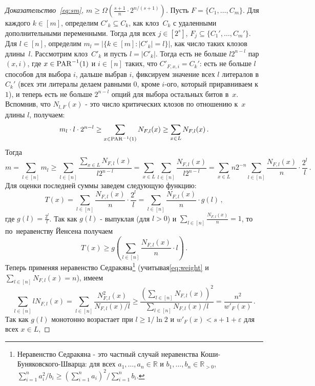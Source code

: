 \begin{proof}[Доказательство~\eqref{eq:sm}, $m \ge \Omega\left(\frac{s+1}{n} \cdot 2^{n/(s+1)}\right)$]
	Пусть $F=\{C_1, \dotsc, C_m\}$. Для каждого $k \in [m]$, определим $C'_k \subseteq C_k$,
	как клоз~$C_k$ с удаленными дополнительными переменными. Тогда для всех
	$j \in [2^s]$, $F_j \subseteq \{C_1', \dotsc, C_m'\}$. Для $l \in [n]$,
	определим $m_l=|\{k \in [m] \colon |C'_k|=l\}|$, как число таких клозов длины~$l$.
	Рассмотрим клоз~$C'_k$
	и пусть $l=|C'_k|$. Тогда есть не больше $l2^{n-l}$ пар $(x,i)$,
	где $x \in \operatorname{PAR}^{-1}(1)$ и $i \in [n]$ таких, что $C'_{F,x,i}=C_k'$:
	есть не больше $l$ способов для выбора $i$, дальше выбрав $i$, 
	фиксируем значение всех $l$ литералов в~$C_k'$ 
	(всех эти литералы делаем равными $0$, кроме $i$-ого, который приравниваем к $1$), 
	и теперь есть не больше $2^{n-l}$ опций для выбора остальных битов в~$x$.
	Вспомнив, что $N_{l,F}(x)$ - это число критических клозов по отношению к~$x$ длины $l$, получаем:
	\[m_l \cdot l \cdot 2^{n - l} \ge \sum_{x \in \operatorname{PAR}^{-1}(1)} N_{F,l}(x) \ge \sum_{x \in L} N_{F,l}(x) \, .\]
	Тогда
	\begin{equation}\label{eq:cc}
		m =\sum_{l \in [n]}m_l \ge \sum_{l \in [n]}\frac{\sum_{x \in L} N_{F,l}(x)}{l2^{n-l}}=
		\sum_{x \in L} \sum_{l\in [n]} \frac{N_{F,l}(x)}{l2^{n-l}} =
		\sum_{x \in L} n2^{-n} \sum_{l \in [n]} \frac{N_{F,l}(x)}{n} \cdot \frac{2^l}{l} \, .
	\end{equation}
	Для оценки последней суммы заведем следующую функцию:
	\[T(x)=\sum_{l \in [n]} \frac{N_{F,l}(x)}{n} \cdot \frac{2^l}{l}=\sum_{l \in [n]} \frac{N_{F,l}(x)}{n}\cdot g(l)\,,\]
	где $g(l) = \frac{2^l}{l}$. Так как $g(l)$ - выпуклая (для $l>0$) и $\sum_{l \in [n]}\frac{N_{F,l}(x)}{n}=1$, то по~неравенству Йенсена получаем
	\begin{equation}\label{eq:aa}
		T(x) \ge g\left(\sum_{l \in [n]} \frac{N_{F,l}(x)}{n}\cdot l\right) \, .
	\end{equation}
	Теперь применяя неравенство Седракяна\footnote{Неравенство Седракяна - это частный случай неравенства Коши-Буняковского-Шварца: для всех $a_1, \dotsc, a_n \in \mathbb R$ и $b_1, \dotsc, b_n \in \mathbb{R}_{>0}$, $\sum_{i=1}^n a_i^2/b_i \ge \left(\sum_{i=1}^n a_i\right)^2/\sum_{i=1}^n b_i$.} (учитывая\eqref{eq:weight} и $\sum_{l \in [n]}N_{F,l}(x)=n$), имеем
	\begin{equation}\label{eq:bb}
		\sum_{l \in [n]} l N_{F,l}(x) = \sum_{l \in [n]} \frac{N_{F,l}^2(x)}{N_{F,l}(x) / l} \ge \frac{(\sum_{l \in [n]} N_{F,l}(x))^2}{\sum_{l \in [n]} N_{F,l}(x) / l} = \frac{n^2}{w'_F(x)} \, .
	\end{equation}
	Так как $g(l)$ монотонно возрастает при $l \ge 1/\ln 2$ и $w'_F(x)<s+1+\varepsilon$ для всех $x \in L$,

\end{proof}
